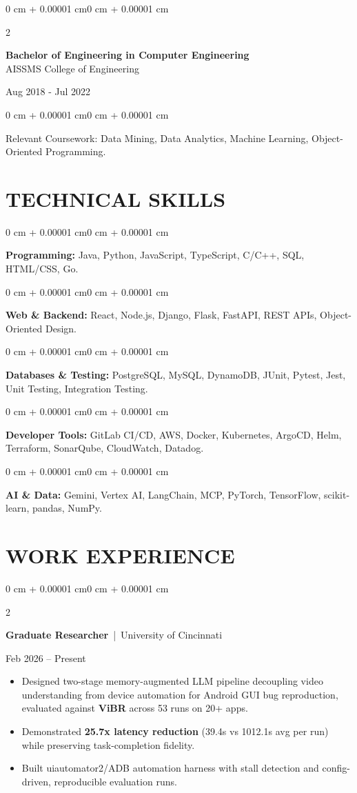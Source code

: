 \documentclass[10pt, letterpaper]{article}
\newenvironment{highlights}{
    \begin{itemize}[
        topsep=0.10 cm,
        parsep=0.06 cm,
        partopsep=0pt,
        itemsep=0.06 cm,
        leftmargin=12pt
    ]
}{
    \end{itemize}
}
\newenvironment{onecolentry}{
    \begin{adjustwidth}{0 cm + 0.00001 cm}{0 cm + 0.00001 cm}
}{
    \end{adjustwidth}
}
\newenvironment{twocolentry}[2][]{
    \onecolentry
    \def\secondColumn{#2}
    \setcolumnwidth{\fill, 4.5 cm}
    \begin{paracol}{2}
}{
    \switchcolumn \raggedleft \secondColumn
    \end{paracol}
    \endonecolentry
}
\begin{document}
\begin{twocolentry}{
    Aug 2018 - Jul 2022
}
    \textbf{Bachelor of Engineering in Computer Engineering} \\
    AISSMS College of Engineering
\end{twocolentry}
\begin{onecolentry}
Relevant Coursework: Data Mining, Data Analytics, Machine Learning, Object-Oriented Programming.
\end{onecolentry}
\section{TECHNICAL SKILLS}
\begin{onecolentry}
\textbf{Programming:} Java, Python, JavaScript, TypeScript, C/C++, SQL, HTML/CSS, Go.
\end{onecolentry}
\vspace{0.06 cm}
\begin{onecolentry}
\textbf{Web \& Backend:} React, Node.js, Django, Flask, FastAPI, REST APIs, Object-Oriented Design.
\end{onecolentry}
\vspace{0.06 cm}
\begin{onecolentry}
\textbf{Databases \& Testing:} PostgreSQL, MySQL, DynamoDB, JUnit, Pytest, Jest, Unit Testing, Integration Testing.
\end{onecolentry}
\vspace{0.06 cm}
\begin{onecolentry}
\textbf{Developer Tools:} GitLab CI/CD, AWS, Docker, Kubernetes, ArgoCD, Helm, Terraform, SonarQube, CloudWatch, Datadog.
\end{onecolentry}
\vspace{0.06 cm}
\begin{onecolentry}
\textbf{AI \& Data:} Gemini, Vertex AI, LangChain, MCP, PyTorch, TensorFlow, scikit-learn, pandas, NumPy.
\end{onecolentry}

\section{WORK EXPERIENCE}
\begin{twocolentry}{Feb 2026 -- Present}
\textbf{Graduate Researcher} \,|\, University of Cincinnati
\end{twocolentry}
\begin{highlights}
  \item Designed two-stage memory-augmented LLM pipeline decoupling video understanding from device automation for Android GUI bug reproduction, evaluated against \textbf{ViBR} across 53 runs on 20+ apps.
  \item Demonstrated \textbf{25.7x latency reduction} (39.4s vs 1012.1s avg per run) while preserving task-completion fidelity.
  \item Built uiautomator2/ADB automation harness with stall detection and config-driven, reproducible evaluation runs.
\end{highlights}
\end{document}
